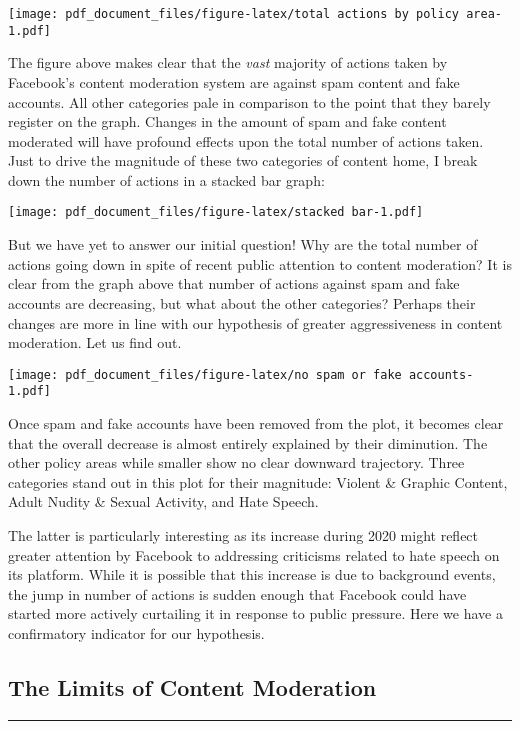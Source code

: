 \documentclass[
]{article}
\begin{document}
\texttt{[image: pdf\_document\_files/figure-latex/total actions by policy area-1.pdf]}

The figure above makes clear that the \emph{vast} majority of actions
taken by Facebook's content moderation system are against spam content
and fake accounts. All other categories pale in comparison to the point
that they barely register on the graph. Changes in the amount of spam
and fake content moderated will have profound effects upon the total
number of actions taken. Just to drive the magnitude of these two
categories of content home, I break down the number of actions in a
stacked bar graph:

\texttt{[image: pdf\_document\_files/figure-latex/stacked bar-1.pdf]}

But we have yet to answer our initial question! Why are the total number
of actions going down in spite of recent public attention to content
moderation? It is clear from the graph above that number of actions
against spam and fake accounts are decreasing, but what about the other
categories? Perhaps their changes are more in line with our hypothesis
of greater aggressiveness in content moderation. Let us find out.

\texttt{[image: pdf\_document\_files/figure-latex/no spam or fake accounts-1.pdf]}

Once spam and fake accounts have been removed from the plot, it becomes
clear that the overall decrease is almost entirely explained by their
diminution. The other policy areas while smaller show no clear downward
trajectory. Three categories stand out in this plot for their magnitude:
Violent \& Graphic Content, Adult Nudity \& Sexual Activity, and Hate
Speech.

The latter is particularly interesting as its increase during 2020 might
reflect greater attention by Facebook to addressing criticisms related
to hate speech on its platform. While it is possible that this increase
is due to background events, the jump in number of actions is sudden
enough that Facebook could have started more actively curtailing it in
response to public pressure. Here we have a confirmatory indicator for
our hypothesis.

\hypertarget{the-limits-of-content-moderation}{%
\subsection{The Limits of Content
Moderation}\label{the-limits-of-content-moderation}}

\begin{center}\rule{0.5\linewidth}{0.5pt}\end{center}
\end{document}
